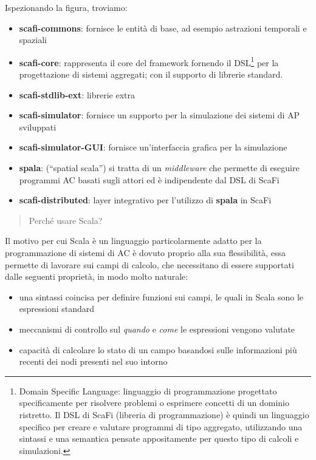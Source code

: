 \documentclass[12pt,a4paper,openright,twoside]{book}
\begin{document}
Ispezionando la figura, troviamo:

\begin{itemize}
    \item \textbf{scafi-commons}: fornisce le entità di base, ad esempio astrazioni temporali e spaziali
    \item \textbf{scafi-core}: rappresenta il core del framework fornendo il DSL\footnote{Domain Specific Language: linguaggio di programmazione progettato specificamente per risolvere problemi o esprimere concetti di un dominio ristretto. Il DSL di ScaFi (libreria di programmazione) è quindi un linguaggio specifico per creare e valutare programmi di tipo aggregato, utilizzando una sintassi e una semantica pensate appositamente per questo tipo di calcoli e simulazioni.} per la progettazione di sistemi aggregati; con il supporto di librerie standard.
    \item \textbf{scafi-stdlib-ext}: librerie extra
    \item \textbf{scafi-simulator}: fornisce un supporto per la simulazione dei sistemi di \ac{AP} sviluppati
    \item \textbf{scafi-simulator-GUI}: fornisce un'interfaccia grafica per la simulazione
    \item \textbf{spala}: (``spatial scala'') si tratta di un \textit{middleware} che permette di eseguire programmi \ac{AC} basati sugli attori ed è indipendente dal DSL di ScaFi
    \item \textbf{scafi-distributed}: layer integrativo per l'utilizzo di \textbf{spala} in ScaFi
\end{itemize}

\begin{quote}
    \centering
    Perché usare Scala?
\end{quote}

Il motivo per cui Scala è un linguaggio particolarmente adatto per la programmazione di sistemi di \ac{AC} è dovuto proprio alla sua flessibilità, essa permette di lavorare sui campi di calcolo, che necessitano di essere supportati dalle seguenti proprietà, in modo molto naturale:

\begin{itemize}
    \item una sintassi coincisa per definire funzioni sui campi, le quali in Scala sono le espressioni standard
    \item meccanismi di controllo sul \textit{quando} e \textit{come} le espressioni vengono valutate
    \item capacità di calcolare lo stato di un campo basandosi sulle informazioni più recenti dei nodi presenti nel suo intorno
\end{itemize}
\end{document}
